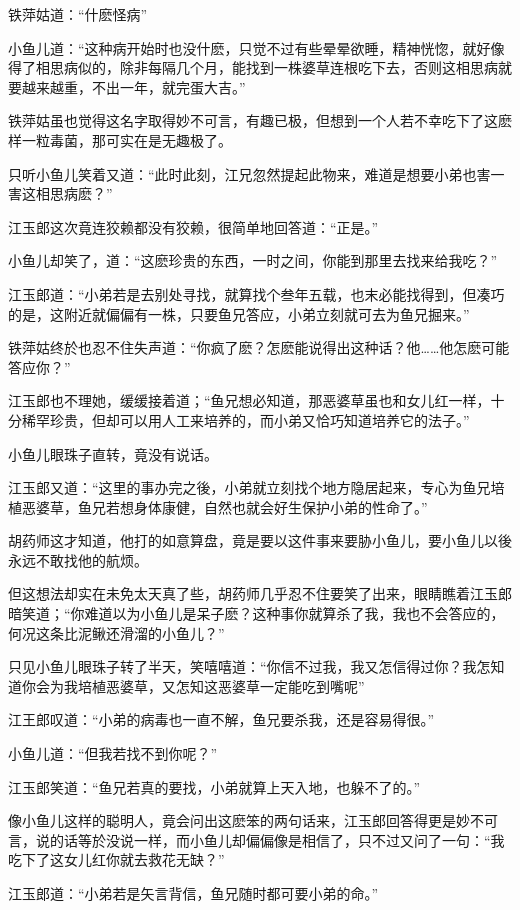 \documentclass[12pt,oneside]{book}
\begin{document}
铁萍姑道：``什麽怪病''

小鱼儿道：``这种病开始时也没什麽，只觉不过有些晕晕欲睡，精神恍惚，就好像得了相思病似的，除非每隔几个月，能找到一株婆草连根吃下去，否则这相思病就要越来越重，不出一年，就完蛋大吉。''

铁萍姑虽也觉得这名字取得妙不可言，有趣已极，但想到一个人若不幸吃下了这麽样一粒毒菌，那可实在是无趣极了。

只听小鱼儿笑着又道：``此时此刻，江兄忽然提起此物来，难道是想要小弟也害一害这相思病麽？''

江玉郎这次竟连狡赖都没有狡赖，很简单地回答道：``正是。''

小鱼儿却笑了，道：``这麽珍贵的东西，一时之间，你能到那里去找来给我吃？''

江玉郎道：``小弟若是去别处寻找，就算找个叁年五载，也末必能找得到，但凑巧的是，这附近就偏偏有一株，只要鱼兄答应，小弟立刻就可去为鱼兄掘来。''

铁萍姑终於也忍不住失声道：``你疯了麽？怎麽能说得出这种话？他\ldots\ldots 他怎麽可能答应你？''

江玉郎也不理她，缓缓接着道；``鱼兄想必知道，那恶婆草虽也和女儿红一样，十分稀罕珍贵，但却可以用人工来培养的，而小弟又恰巧知道培养它的法子。''

小鱼儿眼珠子直转，竟没有说话。

江玉郎又道：``这里的事办完之後，小弟就立刻找个地方隐居起来，专心为鱼兄培植恶婆草，鱼兄若想身体康健，自然也就会好生保护小弟的性命了。''

胡药师这才知道，他打的如意算盘，竟是要以这件事来要胁小鱼儿，要小鱼儿以後永远不敢找他的航烦。

但这想法却实在未免太天真了些，胡药师几乎忍不住要笑了出来，眼睛瞧着江玉郎暗笑道；``你难道以为小鱼儿是呆子麽？这种事你就算杀了我，我也不会答应的，何况这条比泥鳅还滑溜的小鱼儿？''

只见小鱼儿眼珠子转了半天，笑嘻嘻道：``你信不过我，我又怎信得过你？我怎知道你会为我培植恶婆草，又怎知这恶婆草一定能吃到嘴呢''

江王郎叹道：``小弟的病毒也一直不解，鱼兄要杀我，还是容易得很。''

小鱼儿道：``但我若找不到你呢？''

江玉郎笑道：``鱼兄若真的要找，小弟就算上天入地，也躲不了的。''

像小鱼儿这样的聪明人，竟会问出这麽笨的两句话来，江玉郎回答得更是妙不可言，说的话等於没说一样，而小鱼儿却偏偏像是相信了，只不过又问了一句：``我吃下了这女儿红你就去救花无缺？''

江玉郎道：``小弟若是矢言背信，鱼兄随时都可要小弟的命。''
\end{document}
